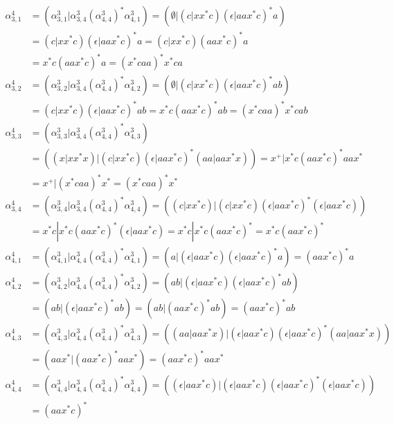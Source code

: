 \documentclass{article}
\begin{document}
\begin{align*}
\alpha^4_{3,1} &= \left(\alpha^3_{3,1}|\alpha^3_{3,4}\left(\alpha^3_{4,4}\right)^*\alpha^3_{4,1}\right) = \left(\emptyset|\left(c|xx^*c\right)\left(\epsilon|aax^*c\right)^*a\right) \\&= \left(c|xx^*c\right)\left(\epsilon|aax^*c\right)^*a = \left(c|xx^*c\right)\left(aax^*c\right)^*a \\&= x^*c\left(aax^*c\right)^*a = \left(x^*caa\right)^*x^*ca \\
\alpha^4_{3,2} &= \left(\alpha^3_{3,2}|\alpha^3_{3,4}\left(\alpha^3_{4,4}\right)^*\alpha^3_{4,2}\right) = \left(\emptyset|\left(c|xx^*c\right)\left(\epsilon|aax^*c\right)^*ab\right) \\&= \left(c|xx^*c\right)\left(\epsilon|aax^*c\right)^*ab = x^*c\left(aax^*c\right)^*ab = \left(x^*caa\right)^*x^*cab \\
\alpha^4_{3,3} &= \left(\alpha^3_{3,3}|\alpha^3_{3,4}\left(\alpha^3_{4,4}\right)^*\alpha^3_{4,3}\right) \\&= \left(\left(x|xx^*x\right)|\left(c|xx^*c\right)\left(\epsilon|aax^*c\right)^*\left(aa|aax^*x\right)\right) = x^+|x^*c\left(aax^*c\right)^*aax^* \\&= x^+|\left(x^*caa\right)^*x^* = \left(x^*caa\right)^*x^*\\
\alpha^4_{3,4} &= \left(\alpha^3_{3,4}|\alpha^3_{3,4}\left(\alpha^3_{4,4}\right)^*\alpha^3_{4,4}\right) = \left(\left(c|xx^*c\right)|\left(c|xx^*c\right)\left(\epsilon|aax^*c\right)^*\left(\epsilon|aax^*c\right)\right) \\&= x^*c|x^*c\left(aax^*c\right)^*\left(\epsilon|aax^*c\right) = x^*c|x^*c\left(aax^*c\right)^* = x^*c\left(aax^*c\right)^* \\
\alpha^4_{4,1} &= \left(\alpha^3_{4,1}|\alpha^3_{4,4}\left(\alpha^3_{4,4}\right)^*\alpha^3_{4,1}\right) = \left(a|\left(\epsilon|aax^*c\right)\left(\epsilon|aax^*c\right)^*a\right) = \left(aax^*c\right)^*a \\
\alpha^4_{4,2} &= \left(\alpha^3_{4,2}|\alpha^3_{4,4}\left(\alpha^3_{4,4}\right)^*\alpha^3_{4,2}\right) = \left(ab|\left(\epsilon|aax^*c\right)\left(\epsilon|aax^*c\right)^*ab\right) \\&= \left(ab|\left(\epsilon|aax^*c\right)^*ab\right) = \left(ab|\left(aax^*c\right)^*ab\right) = \left(aax^*c\right)^*ab \\
\alpha^4_{4,3} &= \left(\alpha^3_{4,3}|\alpha^3_{4,4}\left(\alpha^3_{4,4}\right)^*\alpha^3_{4,3}\right) = \left(\left(aa|aax^*x\right)|\left(\epsilon|aax^*c\right)\left(\epsilon|aax^*c\right)^*\left(aa|aax^*x\right)\right) \\&= \left(aax^*|\left(aax^*c\right)^*aax^*\right) = \left(aax^*c\right)^*aax^* \\
\alpha^4_{4,4} &= \left(\alpha^3_{4,4}|\alpha^3_{4,4}\left(\alpha^3_{4,4}\right)^*\alpha^3_{4,4}\right) = \left(\left(\epsilon|aax^*c\right)|\left(\epsilon|aax^*c\right)\left(\epsilon|aax^*c\right)^*\left(\epsilon|aax^*c\right)\right) \\&= \left(aax^*c\right)^*
\end{align*}
\end{document}
